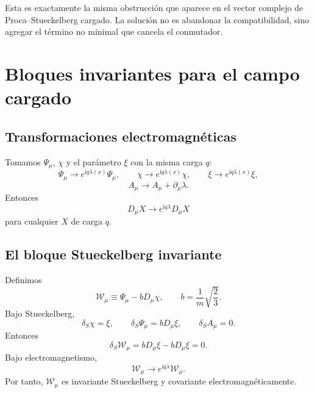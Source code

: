 \documentclass[11pt,a4paper]{article}
\numberwithin{equation}{section}
\newcommand{\Wcal}{\mathcal W}
\newcommand{\ii}{\mathrm i}
\begin{document}
Esta es exactamente la misma obstrucción que aparece en el vector complejo de Proca--Stueckelberg cargado. La solución no es abandonar la compatibilidad, sino agregar el término no minimal que cancela el conmutador.

\section{Bloques invariantes para el campo cargado}
\label{sec:bloques-invariantes-para-el-campo-cargado}

\subsection{Transformaciones electromagnéticas}
\label{subsec:transformaciones-electromagneticas}

Tomamos $\Psi_\mu$, $\chi$ y el parámetro $\xi$ con la misma carga $q$:
\begin{equation}
\Psi_\mu\to e^{\ii q\lambda(x)}\Psi_\mu,
\qquad
\chi\to e^{\ii q\lambda(x)}\chi,
\qquad
\xi\to e^{\ii q\lambda(x)}\xi,
\end{equation}
\begin{equation}
A_\mu\to A_\mu+\partial_\mu\lambda.
\end{equation}
Entonces
\begin{equation}
D_\mu X\to e^{\ii q\lambda}D_\mu X
\end{equation}
para cualquier $X$ de carga $q$.

\subsection{El bloque Stueckelberg invariante}
\label{subsec:el-bloque-stueckelberg-invariante}

Definimos
\begin{equation}
\label{eq:Wcal-def}
\boxed{\Wcal_\mu\equiv\Psi_\mu-bD_\mu\chi,\qquad b=\frac1m\sqrt{\frac23}.}
\end{equation}
Bajo Stueckelberg,
\begin{equation}
\label{eq:S-transf}
\delta_S\chi=\xi,
\qquad
\delta_S\Psi_\mu=bD_\mu\xi,
\qquad
\delta_SA_\mu=0.
\end{equation}
Entonces
\begin{equation}
\delta_S\Wcal_\mu
=bD_\mu\xi-bD_\mu\xi=0.
\end{equation}
Bajo electromagnetismo,
\begin{equation}
\Wcal_\mu\to e^{\ii q\lambda}\Wcal_\mu.
\end{equation}
Por tanto, $\Wcal_\mu$ es invariante Stueckelberg y covariante electromagnéticamente.
\end{document}
